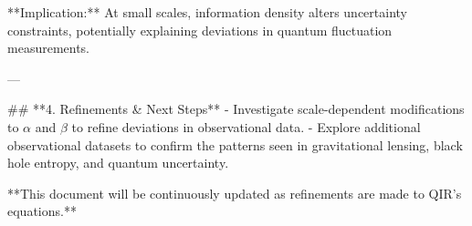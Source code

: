 **Implication:** At small scales, information density alters uncertainty constraints, potentially explaining deviations in quantum fluctuation measurements.

---

## **4. Refinements & Next Steps**
- Investigate scale-dependent modifications to \( \alpha \) and \( \beta \) to refine deviations in observational data.
- Explore additional observational datasets to confirm the patterns seen in gravitational lensing, black hole entropy, and quantum uncertainty.

**This document will be continuously updated as refinements are made to QIR’s equations.**

